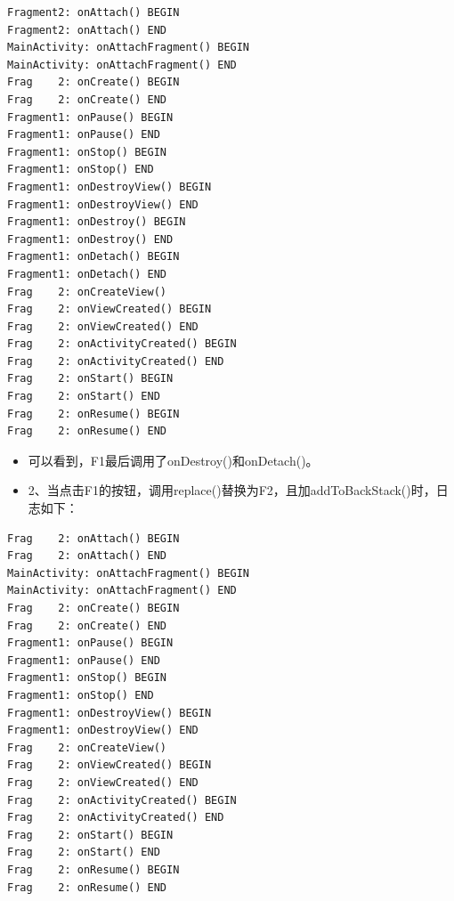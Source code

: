 \documentclass[9pt, b5paaper]{book}
\begin{document}
\begin{verbatim}
Fragment2: onAttach() BEGIN
Fragment2: onAttach() END
MainActivity: onAttachFragment() BEGIN
MainActivity: onAttachFragment() END
Frag    2: onCreate() BEGIN
Frag    2: onCreate() END
Fragment1: onPause() BEGIN
Fragment1: onPause() END
Fragment1: onStop() BEGIN
Fragment1: onStop() END
Fragment1: onDestroyView() BEGIN
Fragment1: onDestroyView() END
Fragment1: onDestroy() BEGIN
Fragment1: onDestroy() END
Fragment1: onDetach() BEGIN
Fragment1: onDetach() END
Frag    2: onCreateView()
Frag    2: onViewCreated() BEGIN
Frag    2: onViewCreated() END
Frag    2: onActivityCreated() BEGIN
Frag    2: onActivityCreated() END
Frag    2: onStart() BEGIN
Frag    2: onStart() END
Frag    2: onResume() BEGIN
Frag    2: onResume() END
\end{verbatim}
\begin{itemize}
\item 可以看到，F1最后调用了onDestroy()和onDetach()。
\item 2、当点击F1的按钮，调用replace()替换为F2，且加addToBackStack()时，日志如下：
\end{itemize}
\begin{verbatim}
Frag    2: onAttach() BEGIN
Frag    2: onAttach() END
MainActivity: onAttachFragment() BEGIN
MainActivity: onAttachFragment() END
Frag    2: onCreate() BEGIN
Frag    2: onCreate() END
Fragment1: onPause() BEGIN
Fragment1: onPause() END
Fragment1: onStop() BEGIN
Fragment1: onStop() END
Fragment1: onDestroyView() BEGIN
Fragment1: onDestroyView() END
Frag    2: onCreateView()
Frag    2: onViewCreated() BEGIN
Frag    2: onViewCreated() END
Frag    2: onActivityCreated() BEGIN
Frag    2: onActivityCreated() END
Frag    2: onStart() BEGIN
Frag    2: onStart() END
Frag    2: onResume() BEGIN
Frag    2: onResume() END
\end{verbatim}
\end{document}
